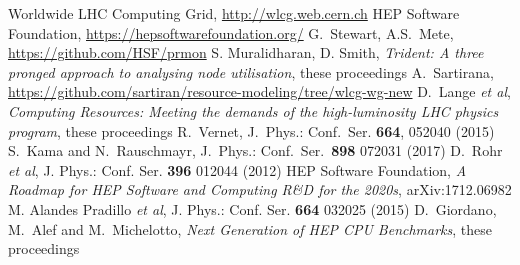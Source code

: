 \begin{thebibliography}{}
Worldwide LHC Computing Grid, \url{http://wlcg.web.cern.ch}
HEP Software Foundation, \url{https://hepsoftwarefoundation.org/}
G.~Stewart, A.S.~Mete, \url{https://github.com/HSF/prmon}
S. Muralidharan, D. Smith, \textit{Trident: A three pronged approach to analysing node utilisation}, these proceedings
A.~Sartirana, \url{https://github.com/sartiran/resource-modeling/tree/wlcg-wg-new}
D.~Lange {\em et al}, \textit{Computing Resources: Meeting the demands of the high-luminosity LHC physics program}, these proceedings
R.~Vernet, J.\ Phys.: Conf.\ Ser. \textbf{664}, 052040 (2015)
S.~Kama and N.~Rauschmayr, J.\ Phys.: Conf.\ Ser.\ {\bf 898} 072031 (2017)
D.~Rohr {\em et al}, J. Phys.: Conf. Ser. \textbf{396} 012044 (2012)
HEP Software Foundation, \textit{A Roadmap for HEP Software and Computing R\&D for the 2020s}, arXiv:1712.06982
M. Alandes Pradillo {\em et al}, J. Phys.: Conf. Ser. \textbf{664} 032025 (2015)
D.~Giordano, M.~Alef and M.~Michelotto, \textit{Next Generation of HEP CPU Benchmarks}, these proceedings
\end{thebibliography}
